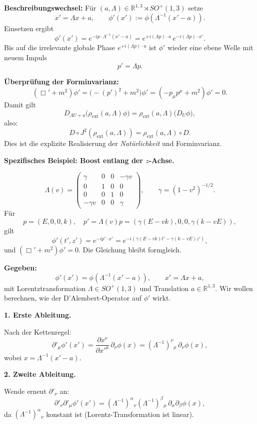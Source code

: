 \documentclass[10pt, letterpaper]{article}
\newcommand{\R}{\mathbb{R}}
\begin{document}
\textbf{Beschreibungswechsel:}  
Für $(a,\Lambda)\in \R^{1,3}\rtimes SO^+(1,3)$ setze
\[
x'=\Lambda x + a,
\qquad
\phi'(x') := \phi(\Lambda^{-1}(x'-a)).
\]
Einsetzen ergibt
\[
\phi'(x') 
= e^{-ip\cdot\Lambda^{-1}(x'-a)}
= e^{+i(\Lambda p)\cdot a}\, e^{-i(\Lambda p)\cdot x'}.
\]
Bis auf die irrelevante globale Phase $e^{+i(\Lambda p)\cdot a}$ ist
\(\phi'\) wieder eine ebene Welle mit neuem Impuls
\[
p' = \Lambda p.
\]

\textbf{Überprüfung der Forminvarianz:}
\[
(\Box' + m^2)\phi'
= \big(-(p')^2 + m^2\big)\phi' 
= ( -p_\mu p^\mu + m^2)\phi' 
= 0.
\]
Damit gilt
\[
D_{\Lambda U + a}\big(\rho_{\mathrm{ext}}(a,\Lambda)\phi\big)
= \rho_{\mathrm{ext}}(a,\Lambda)\big(D_U\phi\big),
\]
also:
\[
D\circ J^2(\rho_{\mathrm{ext}}(a,\Lambda)) = \rho_{\mathrm{ext}}(a,\Lambda)\circ D.
\]
Dies ist die explizite Realisierung der \emph{Natürlichkeit} und Forminvarianz.

\bigskip
\textbf{Spezifisches Beispiel: Boost entlang der $z$-Achse.}

\[
\Lambda(v) =
\begin{pmatrix}
\gamma & 0 & 0 & -\gamma v\\
0 & 1 & 0 & 0\\
0 & 0 & 1 & 0\\
-\gamma v & 0 & 0 & \gamma
\end{pmatrix},
\qquad
\gamma = (1-v^2)^{-1/2}.
\]
Für
\[
p=(E,0,0,k),
\quad
p'=\Lambda(v)p=(\gamma(E-vk),0,0,\gamma(k-vE)),
\]
gilt
\[
\phi'(t',z') = e^{-ip'\cdot x'} = e^{-i(\gamma(E-vk)t' - \gamma(k-vE)z')},
\]
und $(\Box' + m^2)\phi' = 0$.  
Die Gleichung bleibt formgleich.



\textbf{Gegeben:}
\[
\phi'(x') = \phi(\Lambda^{-1}(x' - a)),
\qquad
x' = \Lambda x + a,
\]
mit Lorentztransformation $\Lambda\in SO^+(1,3)$ und Translation $a\in \R^{1,3}$.
Wir wollen berechnen, wie der D’Alembert-Operator auf $\phi'$ wirkt.

\bigskip
\textbf{1. Erste Ableitung.}

Nach der Kettenregel:
\[
\partial'_\mu \phi'(x') 
= \frac{\partial x^\nu}{\partial x'^\mu}\, \partial_\nu \phi(x)
= (\Lambda^{-1})^\nu{}_\mu \, \partial_\nu \phi(x),
\]
wobei $x = \Lambda^{-1}(x' - a)$.

\textbf{2. Zweite Ableitung.}

Wende erneut $\partial'_\nu$ an:
\[
\partial'_\nu \partial'_\mu \phi'(x')
= (\Lambda^{-1})^\alpha{}_\nu (\Lambda^{-1})^\beta{}_\mu \,
\partial_\alpha \partial_\beta \phi(x),
\]
da $(\Lambda^{-1})^\alpha{}_\nu$ konstant ist (Lorentz-Transformation ist linear).
\end{document}
